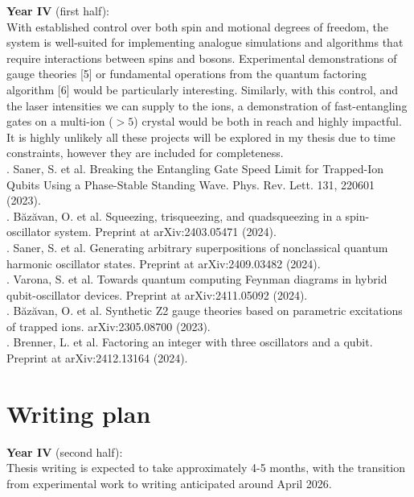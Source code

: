 \documentclass[12pt]{article}
\begin{document}
\noindent \textbf{Year IV} (first half): \\
With established control over both spin and motional degrees of freedom, the system is well-suited for implementing analogue simulations and algorithms that require interactions between spins and bosons. Experimental demonstrations of gauge theories [5] or fundamental operations from the quantum factoring algorithm [6] would be particularly interesting. 
Similarly, with this control, and the laser intensities we can supply to the ions, a demonstration of fast-entangling gates on a multi-ion ($>5$) crystal would be both in reach and highly impactful. \\
It is highly unlikely all these projects will be explored in my thesis due to time constraints, however they are included for completeness.\\

. Saner, S. et al. Breaking the Entangling Gate Speed Limit for Trapped-Ion Qubits Using a Phase-Stable Standing Wave. Phys. Rev. Lett. 131, 220601 (2023).\\
. Băzăvan, O. et al. Squeezing, trisqueezing, and quadsqueezing in a spin-oscillator system. Preprint at arXiv:2403.05471 (2024).\\
. Saner, S. et al. Generating arbitrary superpositions of nonclassical quantum harmonic oscillator states. Preprint at arXiv:2409.03482 (2024).\\
. Varona, S. et al. Towards quantum computing Feynman diagrams in hybrid qubit-oscillator devices. Preprint at arXiv:2411.05092 (2024).\\
. B\u{a}z\u{a}van, O. et al. Synthetic Z2 gauge theories based on parametric excitations of trapped ions. arXiv:2305.08700 (2023).\\
. Brenner, L. et al. Factoring an integer with three oscillators and a qubit. Preprint at arXiv:2412.13164 (2024).\\

\section{Writing plan}
\noindent \textbf{Year IV} (second half): \\
Thesis writing is expected to take approximately 4-5 months, with the transition from experimental work to writing anticipated around April 2026.\\
\end{document}
